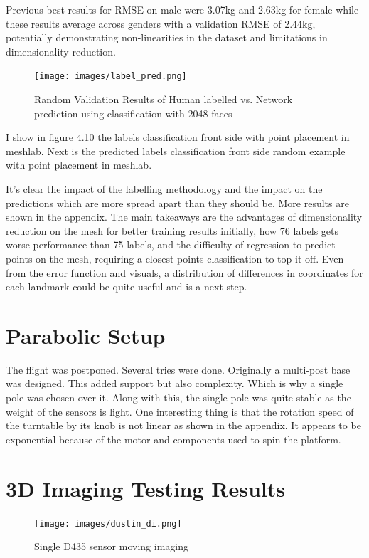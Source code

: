 Previous best results for RMSE on male were 3.07kg and 2.63kg for female while these results average across genders with a validation RMSE of 2.44kg, potentially demonstrating non-linearities in the dataset and limitations in dimensionality reduction.


\begin{figure}[!htb]
	\caption{Random Validation Results of Human labelled vs. Network prediction using classification with 2048 faces}
	\centering
	\texttt{[image: images/label\_pred.png]}
\end{figure}

I show in figure 4.10 the labels classification front side with point placement in meshlab. Next is the predicted labels classification front side random example with point placement in meshlab.

It's clear the impact of the labelling methodology and the impact on the predictions which are more spread apart than they should be. More results are shown in the appendix. The main takeaways are the advantages of dimensionality reduction on the mesh for better training results initially, how 76 labels gets worse performance than 75 labels, and the difficulty of regression to predict points on the mesh, requiring a closest points classification to top it off. Even from the error function and visuals, a distribution of differences in coordinates for each landmark could be quite useful and is a next step.

\section{Parabolic Setup}
The flight was postponed. Several tries were done. Originally a multi-post base was designed. This added support but also complexity. Which is why a single pole was chosen over it. Along with this, the single pole was quite stable as the weight of the sensors is light. One interesting thing is that the rotation speed of the turntable by its knob is not linear as shown in the appendix. It appears to be exponential because of the motor and components used to spin the platform.

\section{3D Imaging Testing Results}

\begin{figure}[!htb]
	\caption{Single D435 sensor moving imaging}
	\centering
	\texttt{[image: images/dustin\_di.png]}
\end{figure}

